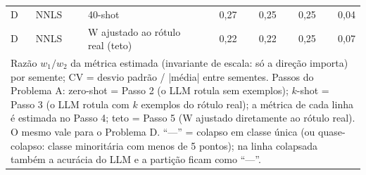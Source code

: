 \begin{table}[htbp]
\begin{tabular}{lllrrrr}
D & NNLS & 40-shot & 0,27 & 0,25 & 0,25 & 0,04 \\
D & NNLS & W ajustado ao rótulo real (teto) & 0,22 & 0,22 & 0,25 & 0,07 \\
\bottomrule
\multicolumn{7}{p{0.95\linewidth}}{\footnotesize Razão $w_1/w_2$ da métrica estimada (invariante de escala: só a direção importa) por semente; CV = desvio padrão / |média| entre sementes. Passos do Problema A: zero-shot = Passo 2 (o LLM rotula sem exemplos); $k$-shot = Passo 3 (o LLM rotula com $k$ exemplos do rótulo real); a métrica de cada linha é estimada no Passo 4; teto = Passo 5 (W ajustado diretamente ao rótulo real). O mesmo vale para o Problema D. ``—'' = colapso em classe única (ou quase-colapso: classe minoritária com menos de 5 pontos); na linha colapsada também a acurácia do LLM e a partição ficam como ``—''.} \\
\end{tabular}
\end{table}
